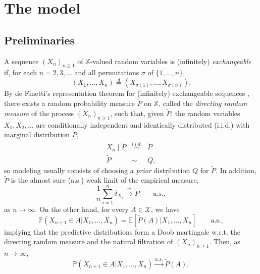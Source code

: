 \documentclass[a4paper]{article}
\theoremstyle{plain}
\theoremstyle{remark}
\theoremstyle{definition}
\begin{document}
\section{The model}\label{section:model}

\subsection{Preliminaries}\label{section:model:prelim}

A sequence $(X_n)_{n\geq 1}$ of $\mathbb{X}$-valued random variables is (infinitely) \emph{exchangeable} if, for each $n=2,3,\ldots$ and all permutations $\sigma$ of $\{1,\ldots,n\}$,
\[(X_1,\ldots,X_n)\overset{d}{=}(X_{\sigma(1)},\ldots,X_{\sigma(n)}).\]
By de Finetti's representation theorem for (infinitely) exchangeable sequences \cite[Theorem 3.1]{aldous1985exchangeability}, there exists a random probability measure $\tilde{P}$ on $\mathbb{X}$, called  the \emph{directing random measure} of the process $(X_n)_{n\geq 1}$, such that, given $\tilde{P}$, the random variables $X_1,X_2,\ldots$ are conditionally independent and identically distributed (i.i.d.) with marginal distribution $\tilde{P}$,
\begin{eqnarray}
X_n\mid\tilde{P} &\overset{i.i.d.}{\sim} & \tilde{P} \nonumber\\ \tilde{P} & \sim & Q, \nonumber
\end{eqnarray}
so modeling usually consists of choosing a \textit{prior} distribution $Q$ for $\tilde{P}$. In addition, $\tilde{P}$ is the almost sure (a.s.) weak limit of the empirical measure,
\begin{equation}\label{eq:model:prelim:empir_conv:weak}
\frac{1}{n}\sum_{i=1}^n\delta_{X_i}\overset{w}{\longrightarrow}\tilde{P}\qquad\mbox{a.s.},
\end{equation}
as $n\rightarrow\infty$. On the other hand, for every $A\in\mathcal{X}$, we have
\begin{equation}\label{eq:model:prelim:predict_mart}
\mathbb{P}(X_{n+1}\in A|X_1,\ldots,X_n)=\mathbb{E}[\tilde{P}(A)|X_1,\ldots,X_n]\qquad\mbox{a.s.},
\end{equation}
implying that the predictive distributions form a Doob martingale w.r.t. the directing random measure and the natural filtration of $(X_n)_{n\geq 1}$. Then, as $n\rightarrow\infty$,
\begin{equation}\label{eq:model:prelim:predict_conv}
\mathbb{P}(X_{n+1}\in A|X_1,\ldots,X_n)\overset{a.s.}{\longrightarrow}\tilde{P}(A),
\end{equation}
\end{document}

